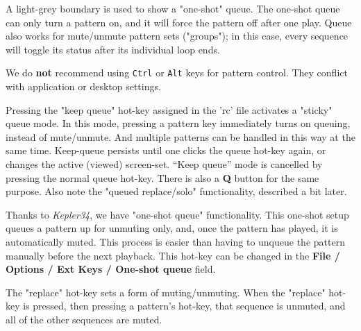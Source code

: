    A light-grey boundary is used to show a "one-shot" queue.
   The one-shot queue can only turn a pattern on, and it
   will force the pattern off after one play.
   Queue also works for mute/unmute pattern sets ("groups"); in this case,
   every sequence will toggle its status after its individual loop ends. 

   We do \textbf{not}
   recommend using \texttt{Ctrl} or \texttt{Alt}
   keys for pattern control.  They conflict with application or desktop
   settings.

   Pressing the "keep queue" hot-key
   assigned in the 'rc' file activates a "sticky" queue mode.
   In this mode, pressing a pattern key immediately turns on queuing, instead
   of mute/unmute.  And multiple patterns can be handled in this way at the
   same time.
   Keep-queue persists until one clicks the queue hot-key again,
   or changes the active (viewed) screen-set. 
   “Keep queue” mode is cancelled by pressing the normal queue hot-key.
   There is also a \textbf{Q} button for the same purpose.
   Also note the "queued replace/solo" functionality, described a bit later.

   Thanks to \textsl{Kepler34}, we have "one-shot queue"
   functionality.  This one-shot setup queues a pattern up for unmuting only,
   and, once the pattern has played, it is automatically muted.  This process
   is easier than having to unqueue the pattern manually before the next
   playback.
   This hot-key can be changed in the
   \textbf{File / Options / Ext Keys / One-shot queue} field.

   The "replace" hot-key sets a form of muting/unmuting.
   When the "replace" hot-key is
   pressed, then pressing a pattern's hot-key,
   that sequence is unmuted, and all of the other sequences are muted.

